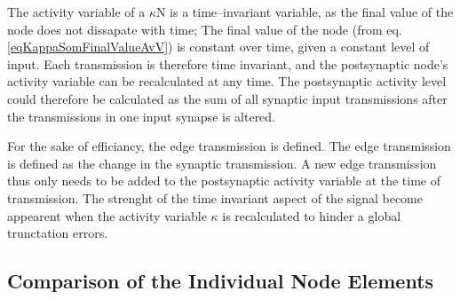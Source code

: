 	The activity variable of a $\kappa$N is a time--invariant variable, as the final value of the node does not dissapate with time;
		The final value of the node (from eq. \ref{eqKappaSomFinalValueAvV}) is constant over time, given a constant level of input.
	Each transmission is therefore time invariant, and the postsynaptic node's activity variable can be recalculated at any time.
	The postsynaptic activity level could therefore be calculated as the sum of all synaptic input transmissions after the transmissions in one input synapse is altered.

	For the sake of efficiancy, the edge transmission is defined.
	The edge transmission is defined as the change in the synaptic transmission.
	A new edge transmission thus only needs to be added to the postsynaptic activity variable at the time of transmission.
	The strenght of the time invariant aspect of the signal become appearent when the activity variable $\kappa$ is recalculated to hinder a global trunctation errors.




	
	\subsection{Comparison of the Individual Node Elements}
				

